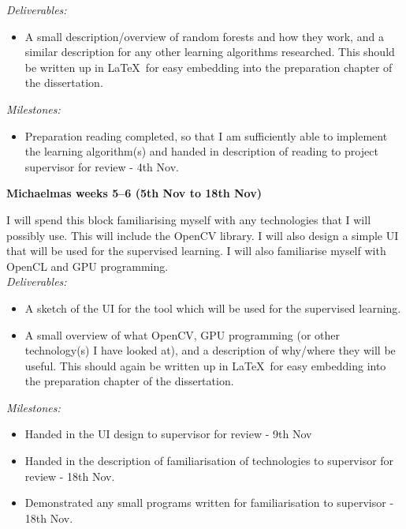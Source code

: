 \documentclass[12pt,a4paper,twoside]{article}
\begin{document}
{\em Deliverables:} 
\begin{itemize} 
    \item 
    A small description/overview of random forests and how they work, and a 
    similar description for any other learning algorithms researched. This 
    should be written up in \LaTeX\ for easy embedding into the preparation 
    chapter of the dissertation.
\end{itemize}

{\em Milestones:}
\begin{itemize}
    \item 
    Preparation reading completed, so that I am sufficiently able to implement 
    the learning algorithm(s) and handed in description of reading to project 
    supervisor for review - 4th Nov.
\end{itemize}



{\bf Michaelmas weeks 5--6 (5th Nov to 18th Nov)} 

I will spend this block familiarising myself with any technologies that I will 
possibly use. This will include the OpenCV library. I will also 
design a simple UI that will be used for the supervised learning. I will also 
familiarise myself with OpenCL and GPU programming. \\

{\em Deliverables:} 
\begin{itemize} 
    \item 
    A sketch of the UI for the tool which will be used for the supervised 
    learning.
    \item 
    A small overview of what OpenCV, GPU programming (or other technology(s) I 
    have looked at), and a description of why/where they will be useful. This 
    should again be written up in \LaTeX\ for easy embedding into the 
    preparation chapter of the dissertation.
\end{itemize}

{\em Milestones:}
\begin{itemize}
    \item 
    Handed in the UI design to supervisor for review - 9th Nov
    \item 
    Handed in the description of familiarisation of technologies to supervisor 
    for review - 18th Nov.
    \item 
    Demonstrated any small programs written for familiarisation to supervisor - 
    18th Nov.
\end{itemize}
\end{document}
